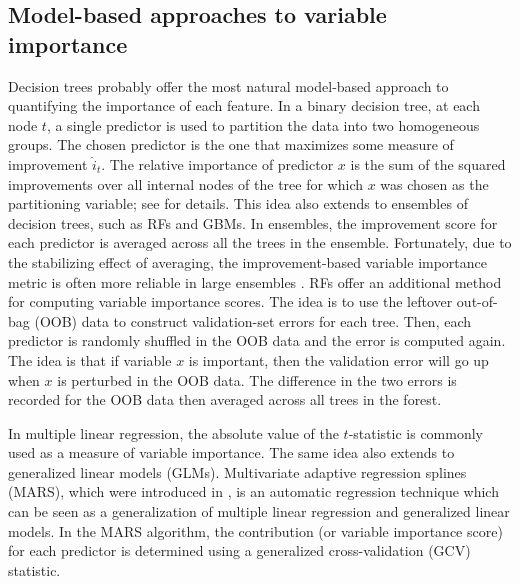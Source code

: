 \documentclass[12pt]{article}
\begin{document}
\subsection{Model-based approaches to variable importance}
\label{sec:model-based-vi}

Decision trees probably offer the most natural model-based approach to quantifying the importance of each feature. In a binary decision tree, at each node $t$, a single predictor is used to partition the data into two homogeneous groups. The chosen predictor is the one that maximizes some measure of improvement $\widehat{i}_t$. The relative importance of predictor $x$ is the sum of the squared improvements over all internal nodes of the tree for which $x$ was chosen as the partitioning variable; see \citet{classification-breiman-1984} for details. This idea also extends to ensembles of decision trees, such as RFs and GBMs. In ensembles, the improvement score for each predictor is averaged across all the trees in the ensemble. Fortunately, due to the stabilizing effect of averaging, the improvement-based variable importance metric is often more reliable in large ensembles \citep[pg. 368]{hastie-elements-2009}. RFs offer an additional method for computing variable importance scores. The idea is to use the leftover out-of-bag (OOB) data to construct validation-set errors for each tree. Then, each predictor is randomly shuffled in the OOB data and the error is computed again. The idea is that if variable $x$ is important, then the validation error will go up when $x$ is perturbed in the OOB data. The difference in the two errors is recorded for the OOB data then averaged across all trees in the forest.

In multiple linear regression, the absolute value of the $t$-statistic is commonly used as a measure of variable importance. The same idea also extends to generalized linear models (GLMs). Multivariate adaptive regression splines (MARS), which were introduced in \citet{friedman-1991-mars}, is an automatic regression technique which can be seen as a generalization of multiple linear regression and generalized linear models. In the MARS algorithm, the contribution (or variable importance score) for each predictor is determined using a generalized cross-validation (GCV) statistic.
\end{document}

